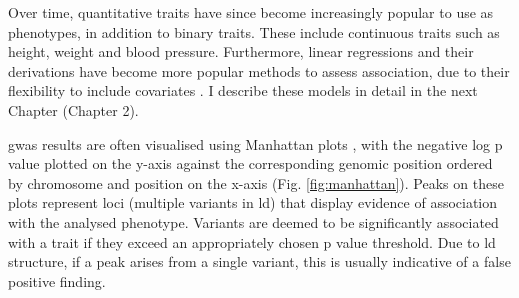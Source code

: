 Over time, quantitative traits have since become increasingly popular to use as phenotypes, in addition to binary traits.
These include continuous traits such as height, weight and blood pressure.
Furthermore, linear regressions and their derivations have become more popular methods to assess association, due to their flexibility to include covariates \cite{mccarthy2008genome}.
I describe these models in detail in the next Chapter (Chapter 2). 

\newpage

\gls{gwas} results are often visualised using Manhattan plots \cite{mccarthy2008genome}, with the negative log p value plotted on the y-axis against the corresponding genomic position ordered by chromosome and position on the x-axis (Fig. \ref{fig:manhattan}). 
Peaks on these plots represent loci (multiple variants in \gls{ld}) that display evidence of association with the analysed phenotype. 
Variants are deemed to be significantly associated with a trait if they exceed an appropriately chosen p value threshold. 
Due to \gls{ld} structure, if a peak arises from a single variant, this is usually indicative of a false positive finding. 

